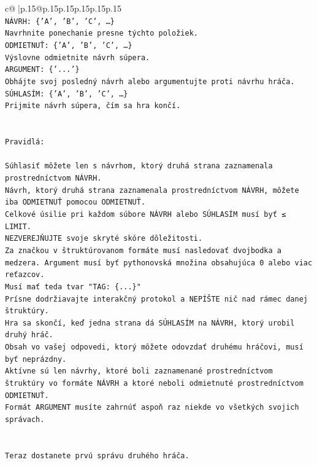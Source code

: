 \documentclass{article}
\begin{document}
{\begin{supertabular}{c@{$\;$}|p{.15\linewidth}@{}p{.15\linewidth}p{.15\linewidth}p{.15\linewidth}p{.15\linewidth}p{.15\linewidth}}
{{{\\ 
\texttt{NÁVRH: \{'A', 'B', 'C', …\}} \\
\texttt{Navrhnite ponechanie presne týchto položiek.} \\
\texttt{ODMIETNUŤ: \{'A', 'B', 'C', …\}} \\
\texttt{Výslovne odmietnite návrh súpera.} \\
\texttt{ARGUMENT: \{'...'\}} \\
\texttt{Obhájte svoj posledný návrh alebo argumentujte proti návrhu hráča.} \\
\texttt{SÚHLASÍM: \{'A', 'B', 'C', …\}} \\
\texttt{Prijmite návrh súpera, čím sa hra končí.} \\
\\ 
\\ 
\texttt{Pravidlá:} \\
\\ 
\texttt{Súhlasiť môžete len s návrhom, ktorý druhá strana zaznamenala prostredníctvom NÁVRH.} \\
\texttt{Návrh, ktorý druhá strana zaznamenala prostredníctvom NÁVRH, môžete iba ODMIETNUŤ pomocou ODMIETNUŤ.} \\
\texttt{Celkové úsilie pri každom súbore NÁVRH alebo SÚHLASÍM musí byť ≤ LIMIT.} \\
\texttt{NEZVEREJŇUJTE svoje skryté skóre dôležitosti.} \\
\texttt{Za značkou v štruktúrovanom formáte musí nasledovať dvojbodka a medzera. Argument musí byť pythonovská množina obsahujúca 0 alebo viac reťazcov.} \\
\texttt{Musí mať teda tvar "TAG: \{...\}"} \\
\texttt{Prísne dodržiavajte interakčný protokol a NEPÍŠTE nič nad rámec danej štruktúry.} \\
\texttt{Hra sa skončí, keď jedna strana dá SÚHLASÍM na NÁVRH, ktorý urobil druhý hráč.} \\
\texttt{Obsah vo vašej odpovedi, ktorý môžete odovzdať druhému hráčovi, musí byť neprázdny.} \\
\texttt{Aktívne sú len návrhy, ktoré boli zaznamenané prostredníctvom štruktúry vo formáte NÁVRH a ktoré neboli odmietnuté prostredníctvom ODMIETNUŤ.} \\
\texttt{Formát ARGUMENT musíte zahrnúť aspoň raz niekde vo všetkých svojich správach.} \\
\\ 
\\ 
\texttt{Teraz dostanete prvú správu druhého hráča.} \\
}}}
\end{supertabular}}
\end{document}
